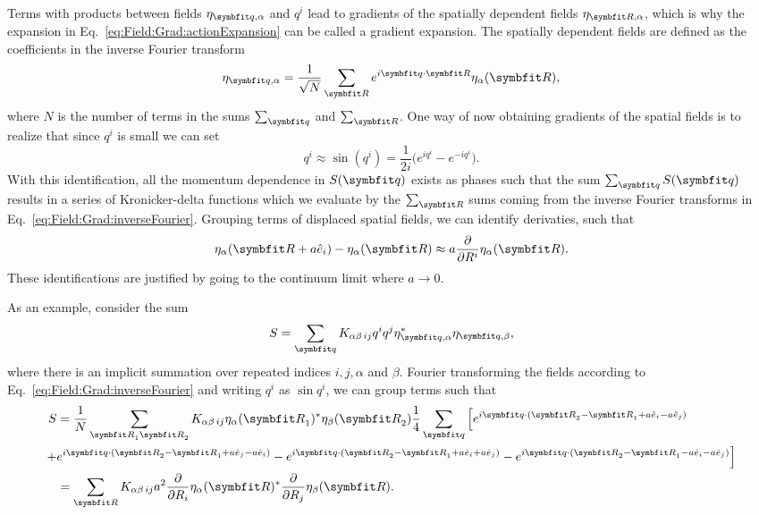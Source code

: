 Terms with products between fields $\eta_{\v{q},\alpha}$ and $q^i$ lead to gradients of the spatially dependent fields $\eta_{\v{R},\alpha}$, which is why the
expansion in Eq.~\eqref{eq:Field:Grad:actionExpansion} can be called a gradient expansion. The spatially dependent fields are defined as the coefficients in the inverse Fourier transform
\begin{equation}
    \label{eq:Field:Grad:inverseFourier}
    \eta_{\v{q},\alpha} = \frac{1}{\sqrt{N}}\sum_\v{R}e^{i\v{q}\cdot\v{R}}\eta_{\alpha}(\v{R}),
\end{equation}
where $N$ is the number of terms in the sums $\sum_\v{q}$ and $\sum_\v{R}$. One way of now obtaining gradients of the spatial fields is to
realize that since $q^i$ is small we can set
\begin{equation}
    \label{eq:Field:Grad:exponential}
    q^i \approx \sin(q^i) = \frac{1}{2i}\Big(e^{iq^i} - e^{-iq^i}\Big).
\end{equation}
With this identification, all the momentum dependence in $S(\v{q})$ exists as phases such that the sum $\sum_\v{q}S(\v{q})$ results in a series of
Kronicker-delta functions which we evaluate by the $\sum_\v{R}$ sums coming from the inverse Fourier transforms in Eq.~\eqref{eq:Field:Grad:inverseFourier}.
Grouping terms of displaced spatial fields, we can identify derivaties, such that
\begin{equation}
    \label{eq:Field:Grad:derivativeId}
    \eta_\alpha(\v{R}+a\hat{e}_i) - \eta_\alpha(\v{R}) \approx a\frac{\partial}{\partial R^i}\eta_\alpha(\v{R}).
\end{equation}
These identifications are justified by going to the continuum limit where $a\to0$.

As an example, consider the sum
\begin{equation}
    \label{eq:Field:Grad:Ex:sum}
    S = \sum_\v{q}K_{\alpha\beta\,ij}q^iq^j\eta_{\v{q},\alpha}^\ast\eta_{\v{q},\beta},
\end{equation}
where there is an implicit summation over repeated indices $i,j,\alpha$ and $\beta$. Fourier transforming the fields according to Eq.~\eqref{eq:Field:Grad:inverseFourier}
and writing $q^i$ as $\sin q^i$, we can group terms such that
\begin{equation}
    \label{eq:Field:Grad:Ex:calculation}
    \begin{split}
        S &= \frac{1}{N}\sum_{\v{R}_1\v{R}_2}K_{\alpha\beta\,ij}\eta_\alpha(\v{R}_1)^\ast\eta_\beta(\v{R}_2)\frac{1}{4}\sum_\v{q}\Big[e^{i\v{q}\cdot(\v{R}_2-\v{R}_1+a\hat{e}_i-a\hat{e}_j)}\\
        + &e^{i\v{q}\cdot(\v{R}_2-\v{R}_1+a\hat{e}_j-a\hat{e}_i)} - e^{i\v{q}\cdot(\v{R}_2-\v{R}_1+a\hat{e}_i+a\hat{e}_j)} - e^{i\v{q}\cdot(\v{R}_2-\v{R}_1-a\hat{e}_i-a\hat{e}_j)}\Big]\\
        &= \sum_{\v{R}}K_{\alpha\beta\,ij}a^2\frac{\partial}{\partial R_i}\eta_\alpha(\v{R})^\ast\frac{\partial}{\partial R_j}\eta_\beta(\v{R}).
    \end{split}
\end{equation}

